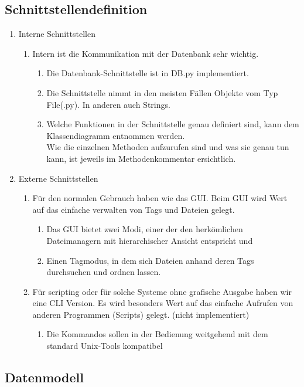 \documentclass[10pt,paper=a4,final]{scrartcl}
\begin{document}
\subsection{Schnittstellendefinition}
\begin{enumerate}
\item Interne Schnittstellen
\begin{enumerate}
\item Intern ist die Kommunikation mit der Datenbank sehr wichtig.
\begin{enumerate}
\item Die Datenbank-Schnittstelle ist in DB.py implementiert.
\item Die Schnittstelle nimmt in den meisten F\"allen Objekte vom Typ File(.py). In anderen auch Strings.
\item Welche Funktionen in der Schnittstelle genau definiert sind, kann dem Klassendiagramm entnommen werden.\\
Wie die einzelnen Methoden aufzurufen sind und was sie genau tun kann, ist jeweils im Methodenkommentar ersichtlich.
\end{enumerate}
\end{enumerate}
\item Externe Schnittstellen
\begin{enumerate}
\item Für den normalen Gebrauch haben wie das GUI. Beim GUI wird Wert auf das einfache verwalten von Tags und Dateien gelegt.
\begin{enumerate}
\item Das GUI bietet zwei Modi, einer der den herkömlichen Dateimanagern mit hierarchischer Ansicht entspricht und
\item Einen Tagmodus, in dem sich Dateien anhand deren Tags durchsuchen und ordnen lassen.
\end{enumerate}
\item Für scripting oder für solche Systeme ohne grafische Ausgabe haben wir eine CLI Version. Es wird besonders Wert auf das einfache Aufrufen von anderen Programmen (Scripts) gelegt. (nicht implementiert)
\begin{enumerate}
\item Die Kommandos sollen in der Bedienung weitgehend mit dem standard Unix-Tools kompatibel
\end{enumerate}
\end{enumerate}
\end{enumerate}
\subsection{Datenmodell}
\end{document}
